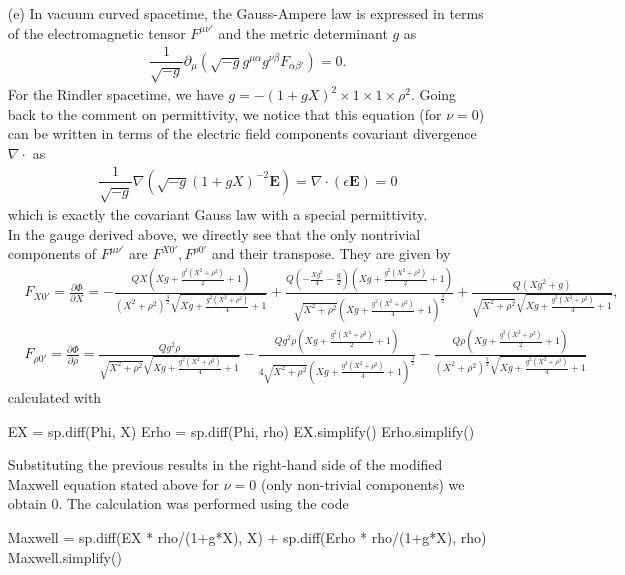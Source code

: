 \documentclass[10pt, a4paper]{article}
\begin{document}
\begin{enumerate}
  \item[(e)]   In vacuum curved spacetime, the Gauss-Ampere law is expressed in terms of the electromagnetic tensor $F^{\mu\nu'}$ and the metric determinant $g$ as 
  \begin{align*}
    \dfrac{1}{\sqrt{-g}} \partial_\mu (\sqrt{-g} g^{\mu \alpha} g^{\nu \beta} F_{\alpha\beta'}) = 0.
  \end{align*}
  For the Rindler spacetime, we have $g = -(1+gX)^2 \times 1 \times 1 \times \rho^2$. Going back to the comment on permittivity, we notice that this equation (for $\nu =0$) can be written in terms of the electric field components covariant divergence $\nabla \cdot$ as 
  \begin{align*}
    \dfrac{1}{\sqrt{-g}} \nabla (\sqrt{-g} (1+gX)^{-2}\mathbf{E}) = \nabla \cdot (\epsilon \mathbf{E}) = 0
  \end{align*}
  which is exactly the covariant Gauss law with a special permittivity.\\
  
  
  In the gauge derived above, we directly see that the only nontrivial components of $F^{\mu\nu'}$ are $F^{X0'}, F^{\rho0'}$ and their transpose. They are given by 
  \begin{align*}
    &F_{X0'} = \frac{\partial \Phi}{\partial X} = - \frac{Q X \left(X g + \frac{g^{2} \left(X^{2} + \rho^{2}\right)}{2} + 1\right)}{\left(X^{2} + \rho^{2}\right)^{\frac{3}{2}} \sqrt{X g + \frac{g^{2} \left(X^{2} + \rho^{2}\right)}{4} + 1}} + \frac{Q \left(- \frac{X g^{2}}{4} - \frac{g}{2}\right) \left(X g + \frac{g^{2} \left(X^{2} + \rho^{2}\right)}{2} + 1\right)}{\sqrt{X^{2} + \rho^{2}} \left(X g + \frac{g^{2} \left(X^{2} + \rho^{2}\right)}{4} + 1\right)^{\frac{3}{2}}} + \frac{Q \left(X g^{2} + g\right)}{\sqrt{X^{2} + \rho^{2}} \sqrt{X g + \frac{g^{2} \left(X^{2} + \rho^{2}\right)}{4} + 1}},\\
    &F_{\rho0'} = \frac{\partial \Phi}{\partial \rho} = \frac{Q g^{2} \rho}{\sqrt{X^{2} + \rho^{2}} \sqrt{X g + \frac{g^{2} \left(X^{2} + \rho^{2}\right)}{4} + 1}} - \frac{Q g^{2} \rho \left(X g + \frac{g^{2} \left(X^{2} + \rho^{2}\right)}{2} + 1\right)}{4 \sqrt{X^{2} + \rho^{2}} \left(X g + \frac{g^{2} \left(X^{2} + \rho^{2}\right)}{4} + 1\right)^{\frac{3}{2}}} - \frac{Q \rho \left(X g + \frac{g^{2} \left(X^{2} + \rho^{2}\right)}{2} + 1\right)}{\left(X^{2} + \rho^{2}\right)^{\frac{3}{2}} \sqrt{X g + \frac{g^{2} \left(X^{2} + \rho^{2}\right)}{4} + 1}}
  \end{align*}
  calculated with 
  \begin{python}
EX = sp.diff(Phi, X)
Erho = sp.diff(Phi, rho)
EX.simplify()
Erho.simplify()
  \end{python}
Substituting the previous results in the right-hand side of the modified Maxwell equation stated above for $\nu = 0$ (only non-trivial components) we obtain $0$. The calculation was performed using the code 
\begin{python}
Maxwell = sp.diff(EX * rho/(1+g*X), X) + sp.diff(Erho * rho/(1+g*X), rho)
Maxwell.simplify()
    \end{python}


\end{enumerate}  
\end{document}
